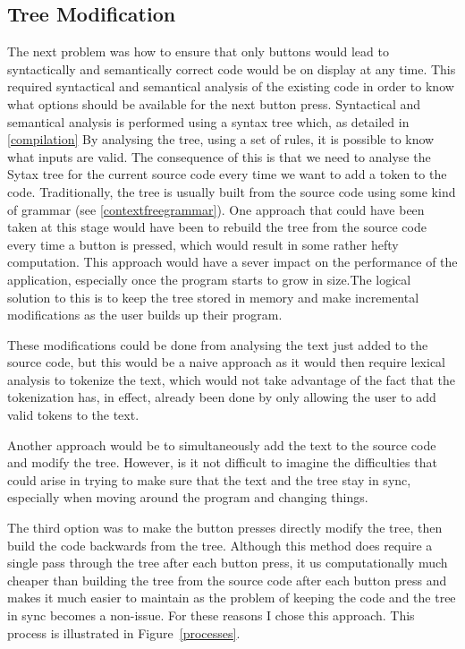 \documentclass[ %
                    author={Jonathan Rankin},
                supervisor={Dr. David May, Dr. Ian Holyer},
                    degree={MEng},
                     title={CodeTouch},
                  subtitle={A Revolutionary Way To Program Real Code On Touch Screen Devices},
                      type={enterprise},
                      year={2015 } ]{dissertation}
\begin{document}
\begin{enumerate}
\section{Tree Modification}
The next problem was how to ensure that only buttons would lead to syntactically and semantically correct code would be on display at any time. This required syntactical and semantical analysis of the existing code in order to know what options should be available for the next button press. Syntactical and semantical analysis is performed using a syntax tree which, as detailed in \ref{compilation} By analysing the tree, using a set of rules, it is possible to know what inputs are valid. The consequence of this is that we need to analyse the Sytax tree for the current source code every time we want to add a token to the code. Traditionally, the tree is usually built from the source code using some kind of grammar (see \ref{contextfreegrammar}). One approach that could have been taken at this stage would have been to rebuild the tree from the source code every time a button is pressed, which would result in some rather hefty computation. This approach would have a sever impact on the performance of the application, especially once the program starts to grow in size.The logical solution to this is to keep the tree stored in memory and make incremental modifications as the user builds up their program.

These modifications could be done from analysing the text just added to the source code, but this would be a naive approach as it would then require lexical analysis to tokenize the text, which would not take advantage of the fact that the tokenization has, in effect, already been done by only allowing the user to add valid tokens to the text. 

Another approach would be to simultaneously add the text to the source code and modify the tree. However, is it not difficult to imagine the difficulties that could arise in trying to make sure that the text and the tree stay in sync, especially when moving around the program and changing things.

The third option was to make the button presses directly modify the tree, then build the code backwards from the tree. Although this method does require a single pass through the tree after each button press, it us computationally much cheaper than building the tree from the source code after each button press and makes it much easier to maintain as the problem of keeping the code and the tree in sync becomes a non-issue. For these reasons I chose this approach. This process is illustrated in Figure~\ref{processes}.




\end{enumerate}
\end{document}
